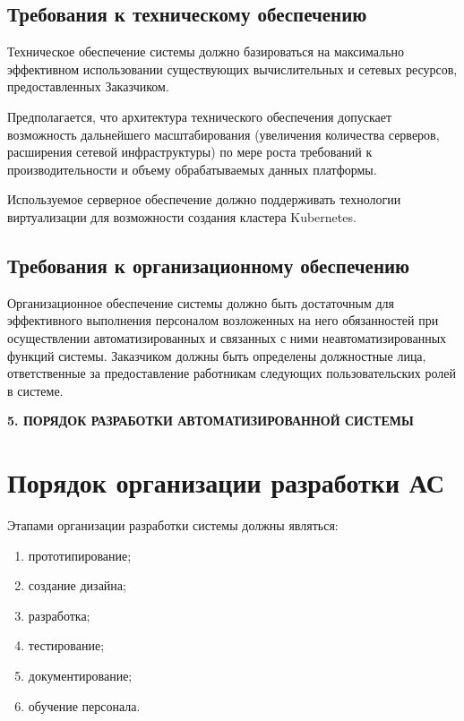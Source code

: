 \subsection{Требования к техническому обеспечению}

Техническое обеспечение системы должно базироваться на максимально эффективном использовании существующих вычислительных и сетевых ресурсов, предоставленных Заказчиком.

Предполагается, что архитектура технического обеспечения допускает возможность дальнейшего масштабирования (увеличения количества серверов, расширения сетевой инфраструктуры) по мере роста требований к производительности и объему обрабатываемых данных платформы.

Используемое серверное обеспечение должно поддерживать технологии виртуализации для возможности создания кластера Kubernetes.

\subsection{Требования к организационному обеспечению}

Организационное обеспечение системы должно быть достаточным для эффективного выполнения персоналом возложенных на него обязанностей при осуществлении автоматизированных и связанных с ними неавтоматизированных функций системы. Заказчиком должны быть определены должностные лица, ответственные за предоставление работникам следующих пользовательских ролей в системе.

\newpage
\begin{center}
  \textbf{\large 5. ПОРЯДОК РАЗРАБОТКИ АВТОМАТИЗИРОВАННОЙ СИСТЕМЫ}
\end{center}

\section{Порядок организации разработки АС}

Этапами организации разработки системы должны являться:

\begin{enumerate}
\item прототипирование;
\item создание дизайна;
\item разработка;
\item тестирование;
\item документирование;
\item обучение персонала.
\end{enumerate}

